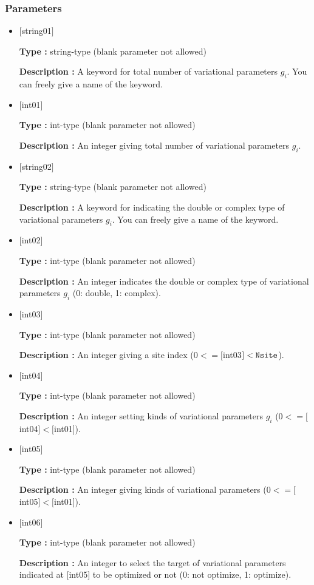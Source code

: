 \subsubsection{Parameters}
 \begin{itemize}

   \item  $[$string01$]$
   
    {\bf Type :} string-type (blank parameter not allowed)

   {\bf Description :}  A keyword for total number of variational parameters $g_i$. You can freely give a name of the keyword.

   \item  $[$int01$]$
   
    {\bf Type :} int-type (blank parameter not allowed)

   {\bf Description :} An integer giving total number of variational parameters $g_i$.

   \item  $[$string02$]$
   
    {\bf Type :} string-type (blank parameter not allowed)

   {\bf Description :}  A keyword for indicating the double or complex type of variational parameters $g_i$. You can freely give a name of the keyword.

  \item  $[$int02$]$
  
 {\bf Type :} int-type (blank parameter not allowed)
 
{\bf Description :} An integer indicates the double or complex type of variational parameters $g_i$ (0: double, 1: complex). 

  \item  $[$int03$]$
  
 {\bf Type :} int-type (blank parameter not allowed)

{\bf Description :}  An integer giving a site index ($0<= [$int03$]<\verb|Nsite|$).
 
 \item  $[$int04$]$
   
   {\bf Type :} int-type (blank parameter not allowed)

  {\bf Description :}  An integer setting kinds of variational  parameters $g_i$ ($0<= [$int04$]<[$int01]). 

 \item  $[$int05$]$
   
   {\bf Type :} int-type (blank parameter not allowed)

  {\bf Description :} An integer giving kinds of variational  parameters ($0<= [$int05$]<[$int01]).

 \item  $[$int06$]$
   
   {\bf Type :} int-type (blank parameter not allowed)

  {\bf Description :}  An integer to select the target of variational parameters indicated at [int05] to be optimized or not (0: not optimize, 1: optimize).
  
\end{itemize}

